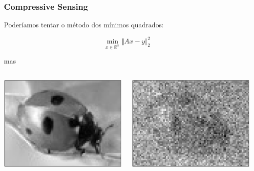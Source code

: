 \documentclass[11pt]{beamer}
\begin{document}
\begin{frame}
\frametitle{Compressive Sensing}
Poderíamos tentar o método dos mínimos quadrados:

$$\min_{x \in \mathbb{R}^n} \Vert Ax - y \Vert_2^2$$

mas

\begin{columns}[t]
\begin{center}
\includegraphics[scale=.25]{imagens/joaninha.png}
\end{center}

\begin{center}
\includegraphics[scale=.25]{imagens/joaninhaMMQ_20porcento.png}
\end{center}
\end{columns}
\end{frame}
\end{document}
